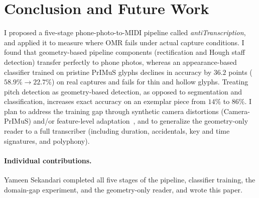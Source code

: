 \section{Conclusion and Future Work}
\label{sec:conclusion}

I proposed a five-stage phone-photo-to-MIDI pipeline called
\emph{antiTranscription}, and applied it to measure where OMR fails under actual
capture conditions. I found that geometry-based pipeline components (rectification
and Hough staff detection) transfer perfectly to phone photos, whereas an
appearance-based classifier trained on pristine PrIMuS glyphs declines in
accuracy by $36.2$ points ($58.9\%\!\rightarrow\!22.7\%$) on real captures and
fails for thin and hollow glyphs. Treating pitch detection as geometry-based
detection, as opposed to segmentation and classification, increases exact
accuracy on an exemplar piece from $14\%$ to $86\%$. I plan to address the
training gap through synthetic camera distortions (Camera-PrIMuS) and/or
feature-level adaptation~\cite{ganin2015dann}, and to generalize the
geometry-only reader to a full transcriber (including duration, accidentals, key
and time signatures, and polyphony).

\paragraph{Individual contributions.} Yameen Sekandari completed all five stages
of the pipeline, classifier training, the domain-gap experiment, and the
geometry-only reader, and wrote this paper.
